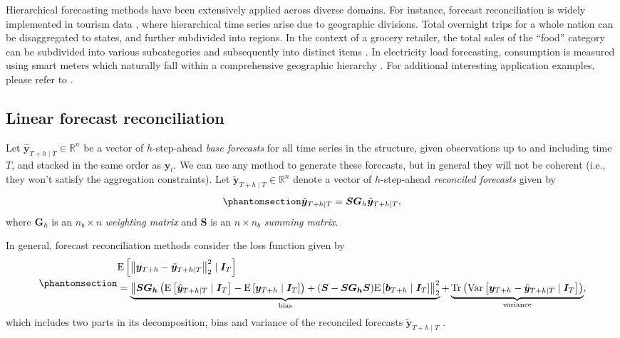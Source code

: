 \documentclass[
  11pt]{article}
\theoremstyle{plain}
\theoremstyle{remark}
\begin{document}
Hierarchical forecasting methods have been extensively applied across
diverse domains. For instance, forecast reconciliation is widely
implemented in tourism data \citep{Athanasopoulos2009-ps}, where
hierarchical time series arise due to geographic divisions. Total
overnight trips for a whole nation can be disaggregated to states, and
further subdivided into regions. In the context of a grocery retailer,
the total sales of the ``food'' category can be subdivided into various
subcategories and subsequently into distinct items
\citep{Zhang2023-op, Hollyman2021-un}. In electricity load forecasting,
consumption is measured using smart meters which naturally fall within a
comprehensive geographic hierarchy \citep{Taieb2021-tc}. For additional
interesting application examples, please refer to
\citet{Athanasopoulos2024-sm}.

\subsection{Linear forecast
reconciliation}\label{linear-forecast-reconciliation}

Let \(\hat{\bm{y}}_{T+h \mid T} \in \mathbb{R}^n\) be a vector of
\(h\)-step-ahead \emph{base forecasts} for all time series in the
structure, given observations up to and including time \(T\), and
stacked in the same order as \(\bm{y}_t\). We can use any method to
generate these forecasts, but in general they will not be coherent
(i.e., they won't satisfy the aggregation constraints). Let
\(\tilde{\bm{y}}_{T+h \mid T} \in \mathbb{R}^n\) denote a vector of
\(h\)-step-ahead \emph{reconciled forecasts} given by
\begin{equation}\phantomsection\label{eq-lr}{
\tilde{\bm{y}}_{T+h \mid T} = \bm{S}\bm{G}_h\hat{\bm{y}}_{T+h \mid T},
}\end{equation} where \(\bm{G}_h\) is an \(n_b \times n\)
\emph{weighting matrix} and \(\bm{S}\) is an \(n \times n_b\)
\emph{summing matrix}.

In general, forecast reconciliation methods consider the loss function
given by \begin{equation}\phantomsection\label{eq-loss}{
\begin{aligned}
& \mathrm{E}\left[\left\|\bm{y}_{T+h}-\tilde{\bm{y}}_{T+h \mid T}\right\|_2^2 \mid \bm{I}_T\right] \\
& =\underbrace{\left\|\bm{S G_h}\left(\mathrm{E}\left[\hat{\bm{y}}_{T+h \mid T} \mid \bm{I}_T\right]-\mathrm{E}\left[\bm{y}_{T+h} \mid \bm{I}_T\right]\right)+(\bm{S}-\bm{S G_h S}) \mathrm{E}\left[\bm{b}_{T+h} \mid \bm{I}_T\right]\right\|_2^2}_{\text{bias}} +\underbrace{\operatorname{Tr}\left(\operatorname{Var}\left[\bm{y}_{T+h}-\tilde{\bm{y}}_{T+h \mid T} \mid \bm{I}_T\right]\right)}_{\text{variance}},
\end{aligned}
}\end{equation} which includes two parts in its decomposition, bias and
variance of the reconciled forecasts \(\tilde{\bm{y}}_{T+h \mid T}\)
\citep{Ben_Taieb2019-be}.
\end{document}
